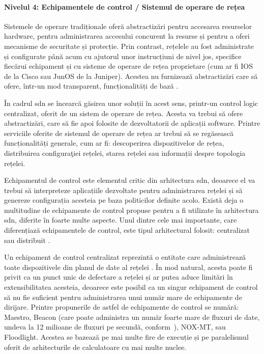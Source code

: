 \paragraph{Nivelul 4: Echipamentele de control / Sistemul de operare de rețea}

Sistemele de operare tradiționale oferă abstractizări pentru accesarea resurselor hardware, pentru administrarea accesului concurent la resurse și pentru a oferi mecanisme de securitate și protecție. Prin contrast, rețelele au fost administrate și configurate până acum cu ajutorul unor instrucțiuni de nivel jos, specifice fiecărui echipament și cu sisteme de operare de rețea proprietare (cum ar fi IOS de la Cisco sau JunOS de la Juniper). Acestea nu furnizează abstractizări care să ofere, într-un mod transparent, funcționalități de bază \cite{kreutz2015software}.

În cadrul \gls{sdn} se încearcă găsirea unor soluții în acest sens, printr-un control logic centralizat, oferit de un sistem de operare de rețea. Acesta va trebui să ofere abstractizări, care să fie apoi folosite de dezvoltatorii de aplicații software. Printre serviciile oferite de sistemul de operare de rețea ar trebui să se regăsească funcționalități generale, cum ar fi: descoperirea dispozitivelor de rețea, distribuirea configuraţiei rețelei, starea rețelei sau informații despre topologia rețelei.

Echipamentul de control este elementul critic din arhitectura \gls{sdn}, deoarece el va trebui să interpreteze aplicațiile dezvoltate pentru administrarea rețelei și să genereze configurația acesteia pe baza politicilor definite acolo. Există deja o multitudine de echipamente de control propuse pentru a fi utilizate în arhitectura \gls{sdn}, diferite în foarte multe aspecte. Unul dintre cele mai importante, care diferențiază echipamentele de control, este tipul arhitectural folosit: centralizat sau distribuit \cite{dixit2013towards, levin2012logically, jimenez2014controller}.

Un echipament de control centralizat reprezintă o entitate care administrează toate dispozitivele din planul de date al rețelei \cite{ome2012software}. În mod natural, acesta poate fi privit ca un punct unic de defectare a rețelei și ar putea aduce limitări în extensibilitatea acesteia, deoarece este posibil ca un singur echipament de control să nu fie suficient pentru administrarea unui număr mare de echipamente de dirijare. Printre propunerile de astfel de echipamente de control se numără: Maestro, Beacon (care poate administra un număr foarte mare de fluxuri de date, undeva la 12 milioane de fluxuri pe secundă, conform~\cite{erickson2013beacon}), NOX-MT, sau Floodlight. Acestea se bazează pe mai multe fire de execuție și pe paralelismul oferit de arhitecturile de calculatoare cu mai multe nuclee.

